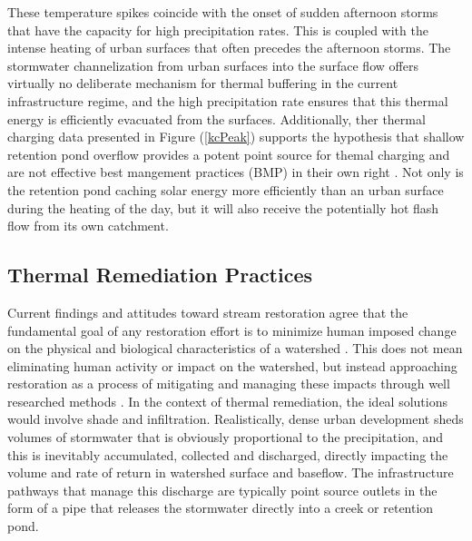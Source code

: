 These temperature spikes coincide with the onset of sudden afternoon storms that have the capacity for high precipitation rates. This is coupled with the intense heating of urban surfaces that often precedes the afternoon storms. The stormwater channelization from urban surfaces into the surface flow offers virtually no deliberate mechanism for thermal buffering in the current infrastructure regime, and the high precipitation rate ensures that this thermal energy is efficiently evacuated from the surfaces. Additionally, ther thermal charging data presented in Figure (\ref{kcPeak}) supports the hypothesis that shallow retention pond overflow provides a potent point source for themal charging and are not effective best mangement practices (BMP) in their own right \citep{thaxAdd2}. Not only is the retention pond caching solar energy more efficiently than an urban surface during the heating of the day, but it will also receive the potentially hot flash flow from its own catchment.

\subsection{Thermal Remediation Practices}
Current findings and attitudes toward stream restoration agree that the fundamental goal of any restoration effort is to minimize human imposed change on the physical and biological characteristics of a watershed \citep{watersheds,urban}. This does not mean eliminating human activity or impact on the watershed, but instead approaching restoration as a process of mitigating and managing these impacts through well researched methods \citep{rgis}. In the context of thermal remediation, the ideal solutions would involve shade and infiltration. Realistically, dense urban development sheds volumes of stormwater that is obviously proportional to the precipitation, and this is inevitably accumulated, collected and discharged, directly impacting the volume and rate of return in watershed surface and baseflow. The infrastructure pathways that manage this discharge are typically point source outlets in the form of a pipe that releases the stormwater directly into a creek or retention pond. 

